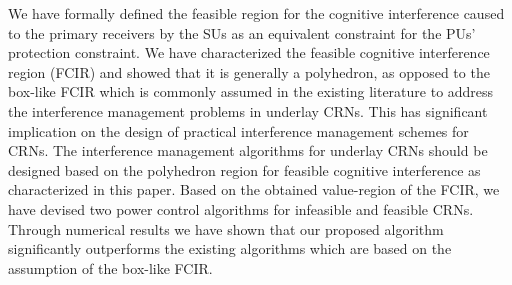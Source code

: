 \documentclass[journal,twoside]{IEEEtran}
\begin{document}
	We have formally defined the feasible region for the cognitive interference caused to the primary receivers by the SUs as an equivalent constraint for the PUs' protection constraint. We have characterized the feasible cognitive interference region (FCIR) and showed that it is generally a polyhedron, as opposed to the box-like FCIR which is commonly assumed in the existing literature to address  the interference management problems in underlay CRNs. This has significant implication on the design of practical interference management schemes for CRNs. 
	The interference management algorithms for underlay CRNs should be designed based on the  polyhedron  region for feasible cognitive interference as characterized in this paper. Based on the obtained value-region of the FCIR, we have devised two power control algorithms for infeasible and feasible CRNs. Through numerical results we have shown that our proposed algorithm significantly outperforms the existing algorithms which are based on the  assumption of the box-like FCIR.


\end{document}
